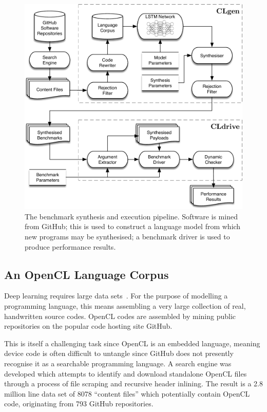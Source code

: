 \begin{figure}
	\centering%
	\includegraphics[width=\columnwidth]{img/clgen-pipeline}%
	\caption[Benchmark synthesis and execution pipeline]{%
    The benchmark synthesis and execution pipeline. Software is mined from GitHub; this is used to construct a language model from which new programs may be synthesised; a benchmark driver is used to produce performance results.%
  }%
	\label{fig:clgen-pipeline}
\end{figure}

\subsection{An OpenCL Language Corpus}
\label{subsec:opencl-lang-corpus}

Deep learning requires large data sets~\cite{LeCun2015}. For the purpose of modelling a programming language, this means assembling a very large collection of real, handwritten source codes. OpenCL codes are assembled by mining public repositories on the popular code hosting site GitHub.

This is itself a challenging task since OpenCL is an embedded language, meaning device code is often difficult to untangle since GitHub does not presently recognise it as a searchable programming language. A search engine was developed which attempts to identify and download standalone OpenCL files through a process of file scraping and recursive header inlining. The result is a 2.8 million line data set of 8078 ``content files'' which potentially contain OpenCL code, originating from 793 GitHub repositories.

